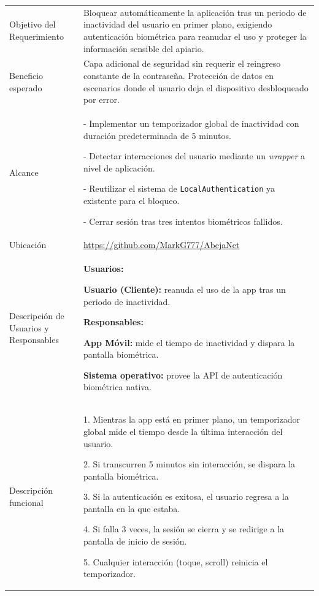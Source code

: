 \noindent
\begin{tabular}{|p{4.5cm}|p{11cm}|}
\hline
\rowcolor{secVerde}\multicolumn{2}{|l|}{\color{white}\textbf{3. DESCRIPCIÓN DEL REQUERIMIENTO}} \\
\hline
Objetivo del Requerimiento &
Bloquear automáticamente la aplicación tras un periodo de inactividad del usuario en primer plano, exigiendo autenticación biométrica para reanudar el uso y proteger la información sensible del apiario. \\
\hline
Beneficio esperado &
Capa adicional de seguridad sin requerir el reingreso constante de la contraseña. Protección de datos en escenarios donde el usuario deja el dispositivo desbloqueado por error. \\
\hline
Alcance &
- Implementar un temporizador global de inactividad con duración predeterminada de 5 minutos. \par
- Detectar interacciones del usuario mediante un \textit{wrapper} a nivel de aplicación. \par
- Reutilizar el sistema de \texttt{LocalAuthentication} ya existente para el bloqueo. \par
- Cerrar sesión tras tres intentos biométricos fallidos. \\
\hline
Ubicación & \url{https://github.com/MarkG777/AbejaNet} \\ \hline
Descripción de Usuarios y Responsables &
\textbf{Usuarios:} \par
\textbf{Usuario (Cliente):} reanuda el uso de la app tras un periodo de inactividad. \par
\vspace{0.1cm}
\textbf{Responsables:} \par
\textbf{App Móvil:} mide el tiempo de inactividad y dispara la pantalla biométrica. \par
\textbf{Sistema operativo:} provee la API de autenticación biométrica nativa. \\
\hline
Descripción funcional &
1. Mientras la app está en primer plano, un temporizador global mide el tiempo desde la última interacción del usuario. \par
2. Si transcurren 5 minutos sin interacción, se dispara la pantalla biométrica. \par
3. Si la autenticación es exitosa, el usuario regresa a la pantalla en la que estaba. \par
4. Si falla 3 veces, la sesión se cierra y se redirige a la pantalla de inicio de sesión. \par
5. Cualquier interacción (toque, scroll) reinicia el temporizador. \\

\end{tabular}
